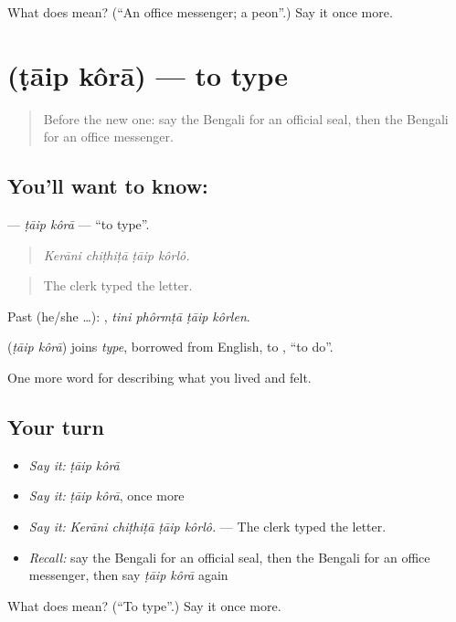 \begin{tcolorbox}[breakable,colback=teal!4,colframe=teal!35!black,title={Before you move on}]
What does  mean? (\textquotedblleft{}An office messenger; a peon\textquotedblright{}.) Say it once more.
\end{tcolorbox}
\section[\texorpdfstring{\bn{টাইপ} \bn{করা} (ṭāip kôrā)}{টাইপ করা (ṭāip kôrā)}]{  (ṭāip kôrā) — to type}

\label{lesson:BN-C493-taip-kora}



\begin{quote}
Before the new one: say the Bengali for an official seal, then the Bengali for an office messenger.
\end{quote}

\subsection*{You'll want to know:  }
\textbf{ } — \emph{ṭāip kôrā} — \textquotedblleft{}to type\textquotedblright{}.

\begin{quote}
   
\end{quote}

\begin{quote}
\emph{Kerāni chiṭhiṭā ṭāip kôrlô.}
\end{quote}

\begin{quote}
The clerk typed the letter.
\end{quote}

Past (he/she …):    , \emph{tini phôrmṭā ṭāip kôrlen}.

\begin{cousinweb}
\textbf{ } (\emph{ṭāip kôrā}) joins \emph{type}, borrowed from English, to , \textquotedblleft{}to do\textquotedblright{}.
\end{cousinweb}

\begin{grammarlens}[title={What you've built}]
One more word for describing what you lived and felt.
\end{grammarlens}

\subsection*{Your turn}
\begin{itemize}
\raggedright
  \item \emph{Say it:} \emph{ṭāip kôrā}
  \item \emph{Say it:} \emph{ṭāip kôrā}, once more
  \item \emph{Say it:} \emph{Kerāni chiṭhiṭā ṭāip kôrlô.} — The clerk typed the letter.
  \item \emph{Recall:} say the Bengali for an official seal, then the Bengali for an office messenger, then say \emph{ṭāip kôrā} again
\end{itemize}

\begin{tcolorbox}[breakable,colback=teal!4,colframe=teal!35!black,title={Before you move on}]
What does   mean? (\textquotedblleft{}To type\textquotedblright{}.) Say it once more.
\end{tcolorbox}
